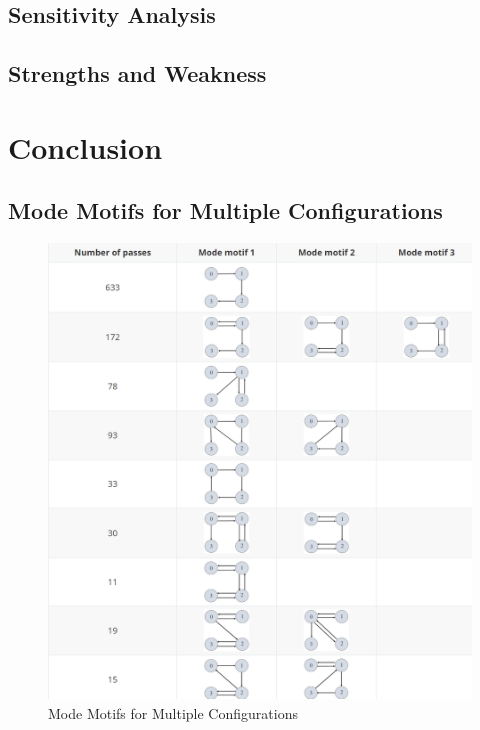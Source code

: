 \documentclass{mcmthesis}
\begin{document}
\subsection{Sensitivity Analysis}
\subsection{Strengths and Weakness}	
\section{Conclusion}


\newpage

\begin{appendices}

\section{Mode Motifs for Multiple Configurations}

\begin{figure}[h]
	\centering
	\includegraphics[width=\textwidth]{figures/motif4.png}
	\caption{Mode Motifs for Multiple Configurations}
	\label{fig:motif4}
\end{figure}

\end{appendices}
\end{document}
